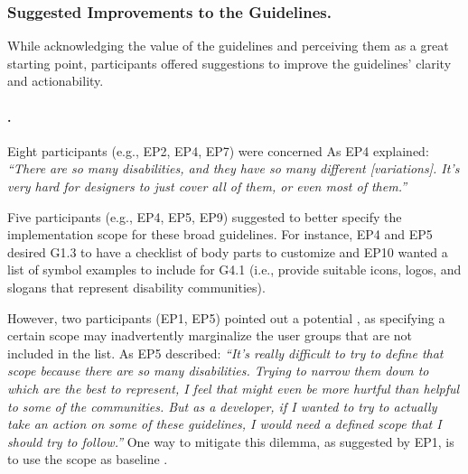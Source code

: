 \subsubsection{Suggested Improvements to the Guidelines.} \label{improvements}
While acknowledging the value of the guidelines and perceiving them as a great starting point, participants offered suggestions to improve the guidelines' clarity and actionability.

\paragraph{\textbf{ .}}
Eight participants (e.g., EP2, EP4, EP7) were concerned 
As EP4 explained: \textit{``There are so many disabilities, and they have so many different [variations]. It's very hard for designers to just cover all of them, or even most of them.''} 

Five participants (e.g., EP4, EP5, EP9) suggested to better specify the implementation scope for these broad guidelines. For instance, EP4 and EP5 desired G1.3 to have a checklist of body parts to customize and EP10 wanted a list of symbol examples to include for G4.1 (i.e., provide suitable icons, logos, and slogans that represent disability communities). 

However, two participants (EP1, EP5) pointed out a potential , as specifying a certain scope may inadvertently marginalize the user groups that are not included in the list. As EP5 described: \textit{``It's really difficult to try to define that scope because there are so many disabilities. Trying to narrow them down to which are the best to represent, I feel that might even be more hurtful than helpful to some of the communities. But as a developer, if I wanted to try to actually take an action on some of these guidelines, I would need a defined scope that I should try to follow.''} One way to mitigate this dilemma, as suggested by EP1, is to use the scope as baseline . %

